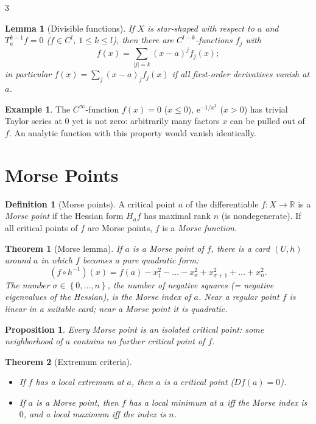 \documentclass[10pt,a4paper,landscape]{article}
\theoremstyle{definition}
\newtheorem{defn}{Definition}[section]
\newtheorem{exm}{Example}[section]
\theoremstyle{plain}
\newtheorem{thm}{Theorem}[section]
\newtheorem{lem}{Lemma}[section]
\newtheorem{prop}{Proposition}[section]
\theoremstyle{remark}
\newcommand{\R}{\mathbb{R}}
\newcommand{\e}{\mathrm{e}}
\newcommand{\abs}[1]{\lvert #1 \rvert}
\newcommand{\set}[1]{\left\{ #1 \right\}}
\newcommand{\oo}{\infty}
\newcommand{\comp}{\circ}
\begin{document}
\begin{multicols*}{3}
\begin{lem}[Divisible functions]
If $X$ is star-shaped with respect to $a$ and $T_a^{k-1}f = 0$ ($f \in C^l$, $1 \le k \le l$), then there are $C^{l-k}$-functions $f_j$ with
\[
f(x) = \sum_{\abs{j} = k} (x-a)^j f_j(x) ;
\]
in particular $f(x) = \sum_j (x-a)_j f_j(x)$ if all first-order derivatives vanish at $a$.
\end{lem}

\begin{exm}
The $C^\oo$-function $f(x) = 0$ ($x \le 0$), $\e^{-1/x^2}$ ($x > 0$) has trivial Taylor series at $0$ yet is not zero: arbitrarily many factors $x$ can be pulled out of $f$. An analytic function with this property would vanish identically.
\end{exm}

\section{Morse Points}

\begin{defn}[Morse points]
A critical point $a$ of the differentiable $f: X \to \R$ is a \emph{Morse point} if the Hessian form $H_a f$ has maximal rank $n$ (is nondegenerate). If all critical points of $f$ are Morse points, $f$ is a \emph{Morse function}.
\end{defn}

\begin{thm}[Morse lemma]
If $a$ is a Morse point of $f$, there is a card $(U,h)$ around $a$ in which $f$ becomes a pure quadratic form:
\[
(f \comp h^{-1})(x) = f(a) - x_1^2 - \dots - x_\sigma^2 + x_{\sigma+1}^2 + \dots + x_n^2 .
\]
The number $\sigma \in \set{0, \dots, n}$, the number of negative squares (= negative eigenvalues of the Hessian), is the \emph{Morse index} of $a$. Near a regular point $f$ is linear in a suitable card; near a Morse point it is quadratic.
\end{thm}

\begin{prop}
Every Morse point is an \emph{isolated} critical point: some neighborhood of $a$ contains no further critical point of $f$.
\end{prop}

\begin{thm}[Extremum criteria]
\begin{itemize}
\item If $f$ has a local extremum at $a$, then $a$ is a critical point ($Df(a) = 0$).
\item If $a$ is a Morse point, then $f$ has a local minimum at $a$ iff the Morse index is $0$, and a local maximum iff the index is $n$.
\end{itemize}
\end{thm}


\end{multicols*}
\end{document}

